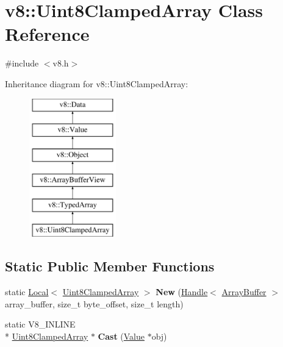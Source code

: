 \hypertarget{classv8_1_1Uint8ClampedArray}{\section{v8\-:\-:Uint8\-Clamped\-Array Class Reference}
\label{classv8_1_1Uint8ClampedArray}
}


{\ttfamily \#include $<$v8.\-h$>$}

Inheritance diagram for v8\-:\-:Uint8\-Clamped\-Array\-:\begin{figure}[H]
\begin{center}
\leavevmode
\includegraphics[height=6.000000cm]{classv8_1_1Uint8ClampedArray}
\end{center}
\end{figure}
\subsection*{Static Public Member Functions}
\begin{DoxyCompactItemize}
\item 
\hypertarget{classv8_1_1Uint8ClampedArray_ac1979cc1d0591a35e412a0fde9572667}{static \hyperlink{classv8_1_1Local}{Local}$<$ \hyperlink{classv8_1_1Uint8ClampedArray}{Uint8\-Clamped\-Array} $>$ {\bfseries New} (\hyperlink{classv8_1_1Handle}{Handle}$<$ \hyperlink{classv8_1_1ArrayBuffer}{Array\-Buffer} $>$ array\-\_\-buffer, size\-\_\-t byte\-\_\-offset, size\-\_\-t length)}\label{classv8_1_1Uint8ClampedArray_ac1979cc1d0591a35e412a0fde9572667}

\item 
\hypertarget{classv8_1_1Uint8ClampedArray_aa1358e0ac24e305af5c90ba71b73fa7c}{static V8\-\_\-\-I\-N\-L\-I\-N\-E \\*
\hyperlink{classv8_1_1Uint8ClampedArray}{Uint8\-Clamped\-Array} $\ast$ {\bfseries Cast} (\hyperlink{classv8_1_1Value}{Value} $\ast$obj)}\label{classv8_1_1Uint8ClampedArray_aa1358e0ac24e305af5c90ba71b73fa7c}

\end{DoxyCompactItemize}

